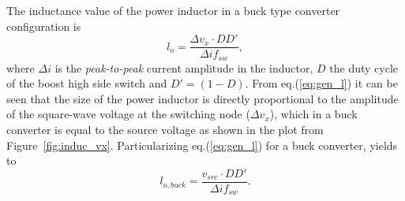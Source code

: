 The inductance value of the power inductor in a buck type converter configuration is
\begin{equation}
 l_{o}   = \frac{\Delta v_{x} \cdot DD'}{\Delta i f_{sw}},
\label{eq:gen_l}
\end{equation}
where $\Delta i$ is the \emph{peak-to-peak} current amplitude in the inductor, $D$ the duty cycle of the boost high side switch and $D'=(1-D)$. From eq.(\ref{eq:gen_l}) it can be seen that the size of the power inductor is directly proportional to the amplitude of the square-wave voltage at the switching node ($\Delta v_x$), which in a buck converter is equal to the source voltage as shown in the plot from Figure~\ref{fig:induc_vx}. Particularizing eq.(\ref{eq:gen_l}) for a buck converter, yields to
\begin{equation}
 l_{o,buck}  = \frac{v_{src} \cdot DD'}{\Delta i f_{sw} }.
\label{eq:buck_l}
\end{equation}

